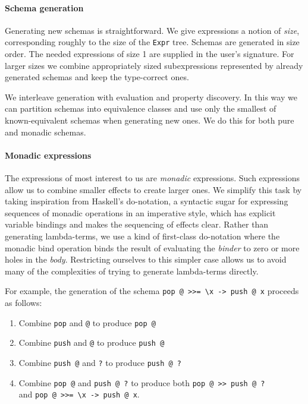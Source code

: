 \paragraph{Schema generation}
Generating new schemas is straightforward.  We give expressions a
notion of \emph{size}, corresponding roughly to the size of the
\verb|Expr| tree.  Schemas are generated in size order.  The needed
expressions of size 1 are supplied in the user's signature.  For
larger sizes we combine appropriately sized subexpressions represented
by already generated schemas and keep the type-correct ones.

We interleave generation with evaluation and property discovery.  In
this way we can partition schemas into equivalence classes and use
only the smallest of known-equivalent schemas when generating new
ones.  We do this for both pure and monadic schemas.

\paragraph{Monadic expressions}
The expressions of most interest to us are \emph{monadic} expressions.
Such expressions allow us to combine smaller effects to create larger
ones.  We simplify this task by taking inspiration from Haskell's
do-notation, a syntactic sugar for expressing sequences of monadic
operations in an imperative style, which has explicit variable
bindings and makes the sequencing of effects clear.  Rather than
generating lambda-terms, we use a kind of first-class do-notation
where the monadic bind operation binds the result of evaluating the
\emph{binder} to zero or more holes in the \emph{body}.  Restricting
ourselves to this simpler case allows us to avoid many of the
complexities of trying to generate lambda-terms directly.

For example, the generation of the schema
\verb|pop @ >>= \x -> push @ x| proceeds as follows:

\begin{enumerate}
\item Combine \verb|pop| and \verb|@| to produce \verb|pop @|
\item Combine \verb|push| and \verb|@| to produce \verb|push @|
\item Combine \verb|push @| and \verb|?| to produce \verb|push @ ?|
\item Combine \verb|pop @| and \verb|push @ ?| to produce both
  \verb|pop @ >> push @ ?|\\and \verb|pop @ >>= \x -> push @ x|.
\end{enumerate}

